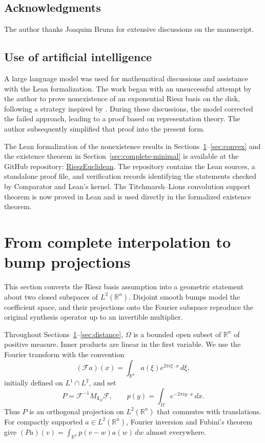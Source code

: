 \documentclass[a4paper,12pt,reqno]{amsart}
\newcommand{\lead}[1]{\par\smallskip\noindent\leavevmode#1\par\smallskip}
\theoremstyle{remark}
\numberwithin{equation}{section}
\newcommand{\R}{\mathbb R}
\newcommand{\Ff}{\mathcal F}
\newcommand{\one}{\mathbf 1}
\begin{document}
\subsection*{Acknowledgments}
The author thanks Joaquim Bruna for extensive discussions on the manuscript.

\subsection*{Use of artificial intelligence}
A large language model was used for mathematical discussions and
assistance with the Lean formalization. The work began with an unsuccessful
attempt by the author to prove nonexistence of an exponential Riesz basis
on the disk, following a strategy inspired by
\cite{MateiMeyerOrtegaCerda}. During these discussions, the model corrected
the failed approach, leading to a proof based on representation theory.
The author subsequently simplified that proof into the present form.

The Lean formalization of the nonexistence results in
Sections~\ref{sec:bumps}--\ref{sec:convex} and the existence theorem in
Section~\ref{sec:complete-minimal} is available at the GitHub repository:
\href{https://github.com/joaquimortega/RieszEuclidean}{RieszEuclidean}.
The repository contains the Lean sources, a standalone
proof file, and verification records identifying the statements checked by
Comparator and Lean's kernel. The Titchmarsh--Lions convolution support
theorem is now proved in Lean and is used directly in the formalized
existence theorem.

\section{From complete interpolation to bump projections}\label{sec:bumps}

\lead{This section converts the Riesz basis assumption into a geometric
statement about two closed subspaces of $L^2(\R^n)$. Disjoint smooth bumps
model the coefficient space, and their projections onto the Fourier
subspace reproduce the original synthesis operator up to an invertible
multiplier.}


Throughout Sections~\ref{sec:bumps}--\ref{sec:distance}, $\Omega$ is a
bounded open subset of $\R^n$ of positive measure. Inner products are
linear in the first variable. We use the Fourier transform with the convention
\[
 (\Ff a)(x)=\int_{\R^n}a(\xi)e^{2\pi i\xi\cdot x}\,d\xi,
\]
initially defined on $L^1\cap L^2$, and set
\begin{equation}\label{eq:P}
 P=\Ff^{-1}M_{\one_\Omega}\Ff,\qquad
 p(y)=\int_\Omega e^{-2\pi iy\cdot x}\,dx.
\end{equation}
Thus $P$ is an orthogonal projection on $L^2(\R^n)$ that commutes with
translations. For compactly supported $a\in L^2(\R^n)$, Fourier inversion
and Fubini's theorem give
$(Pa)(v)=\int_{\R^n}p(v-w)a(w)\,dw$ almost everywhere.
\end{document}
